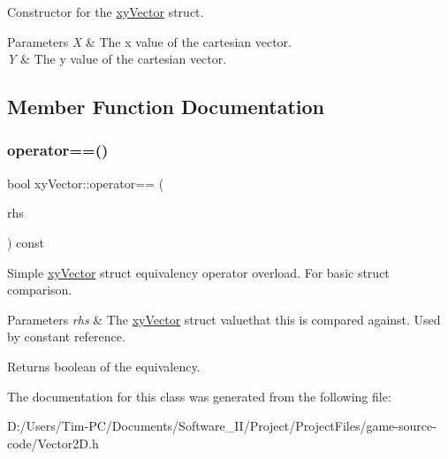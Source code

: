 Constructor for the \hyperlink{structxy_vector}{xy\+Vector} struct. 


\begin{DoxyParams}{Parameters}
{\em X} & The x value of the cartesian vector. \\
\hline
{\em Y} & The y value of the cartesian vector. \\
\hline
\end{DoxyParams}


\subsection{Member Function Documentation}
\mbox{\label{structxy_vector_a7aca10ebc499fdf7944792741edec285}} 
\subsubsection{\texorpdfstring{operator==()}{operator==()}}
{\footnotesize\ttfamily bool xy\+Vector\+::operator== (\begin{DoxyParamCaption}\item[{const \hyperlink{structxy_vector}{xy\+Vector} \&}]{rhs }\end{DoxyParamCaption}) const\hspace{0.3cm}{\ttfamily [inline]}}



Simple \hyperlink{structxy_vector}{xy\+Vector} struct equivalency operator overload. For basic struct comparison. 


\begin{DoxyParams}{Parameters}
{\em rhs} & The \hyperlink{structxy_vector}{xy\+Vector} struct valuethat this is compared against. Used by constant reference. \\
\hline
\end{DoxyParams}
\begin{DoxyReturn}{Returns}
boolean of the equivalency. 
\end{DoxyReturn}


The documentation for this class was generated from the following file\+:\begin{DoxyCompactItemize}
\item 
D\+:/\+Users/\+Tim-\/\+P\+C/\+Documents/\+Software\+\_\+\+I\+I/\+Project/\+Project\+Files/game-\/source-\/code/Vector2\+D.\+h\end{DoxyCompactItemize}
